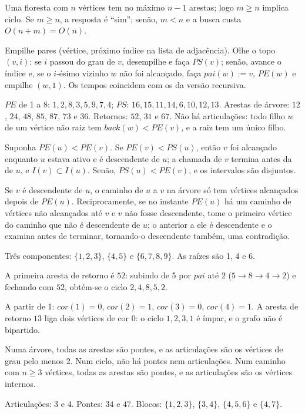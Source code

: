  Uma floresta com $n$ vértices tem no máximo $n-1$ arestas; logo $m\ge n$ implica ciclo. Se $m\ge n$, a resposta é ``sim''; senão, $m<n$ e a busca custa $O(n+m)=O(n)$.

 Empilhe pares (vértice, próximo índice na lista de adjacência). Olhe o topo $(v,i)$: se $i$ passou do grau de $v$, desempilhe e faça $PS(v)$; senão, avance o índice e, se o $i$-ésimo vizinho $w$ não foi alcançado, faça $pai(w):=v$, $PE(w)$ e empilhe $(w,1)$. Os tempos coincidem com os da versão recursiva.

 $PE$ de 1 a 8: $1,2,8,3,5,9,7,4$; $PS$: $16,15,11,14,6,10,12,13$. Arestas de árvore: $12$, $24$, $48$, $85$, $87$, $73$ e $36$. Retornos: $52$, $31$ e $67$. Não há articulações: todo filho $w$ de um vértice não raiz tem $back(w)<PE(v)$, e a raiz tem um único filho.

 Suponha $PE(u)<PE(v)$. Se $PE(v)<PS(u)$, então $v$ foi alcançado enquanto $u$ estava ativo e é descendente de $u$; a chamada de $v$ termina antes da de $u$, e $I(v)\subset I(u)$. Senão, $PS(u)<PE(v)$, e os intervalos são disjuntos.

 Se $v$ é descendente de $u$, o caminho de $u$ a $v$ na árvore só tem vértices alcançados depois de $PE(u)$. Reciprocamente, se no instante $PE(u)$ há um caminho de vértices não alcançados até $v$ e $v$ não fosse descendente, tome o primeiro vértice do caminho que não é descendente de $u$; o anterior a ele é descendente e o examina antes de terminar, tornando-o descendente também, uma contradição.

 Três componentes: $\{1,2,3\}$, $\{4,5\}$ e $\{6,7,8,9\}$. As raízes são 1, 4 e 6.

 A primeira aresta de retorno é $52$: subindo de 5 por $pai$ até 2 ($5\to8\to4\to2$) e fechando com $52$, obtém-se o ciclo $2,4,8,5,2$.

 A partir de 1: $cor(1)=0$, $cor(2)=1$, $cor(3)=0$, $cor(4)=1$. A aresta de retorno $13$ liga dois vértices de cor 0: o ciclo $1,2,3,1$ é ímpar, e o grafo não é bipartido.

 Numa árvore, todas as arestas são pontes, e as articulações são os vértices de grau pelo menos 2. Num ciclo, não há pontes nem articulações. Num caminho com $n\ge3$ vértices, todas as arestas são pontes, e as articulações são os vértices internos.

 Articulações: 3 e 4. Pontes: $34$ e $47$. Blocos: $\{1,2,3\}$, $\{3,4\}$, $\{4,5,6\}$ e $\{4,7\}$.

